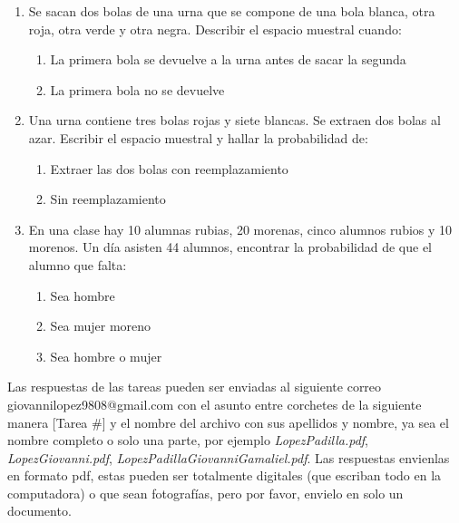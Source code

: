 \documentclass[12pt,letterpaper]{report}
\begin{document}
\begin{enumerate}
\begin{enumerate}
    \end{enumerate}
    \item Se sacan dos bolas de una urna que se compone de una bola blanca, otra roja, otra verde y otra negra. Describir el espacio muestral cuando:
    \begin{enumerate}
    \item La primera bola se devuelve a la urna antes de sacar la segunda
    \item La primera bola no se devuelve
    \end{enumerate}
    \item Una urna contiene tres bolas rojas y siete blancas. Se extraen dos bolas al azar. Escribir el espacio muestral y hallar la probabilidad de:
    \begin{enumerate}
    \item Extraer las dos bolas con reemplazamiento
    \item Sin reemplazamiento
    \end{enumerate}
    \item En una clase hay 10 alumnas rubias, 20 morenas, cinco alumnos rubios y 10 morenos. Un día asisten 44 alumnos, encontrar la probabilidad de que el alumno que falta:
    \begin{enumerate}
    \item Sea hombre
    \item Sea mujer moreno
    \item Sea hombre o mujer
    \end{enumerate}
\end{enumerate}
Las respuestas de las tareas pueden ser enviadas al siguiente correo giovannilopez9808@gmail.com con el asunto entre corchetes de la siguiente manera [Tarea \#] y el nombre del archivo con sus apellidos y nombre, ya sea el nombre completo o solo una parte, por ejemplo \textit{LopezPadilla.pdf}, \textit{LopezGiovanni.pdf}, \textit{LopezPadillaGiovanniGamaliel.pdf}. Las respuestas envienlas en formato pdf, estas pueden ser totalmente digitales (que escriban todo en la computadora) o que sean fotografías, pero por favor, envielo en solo un documento.
\end{document}
